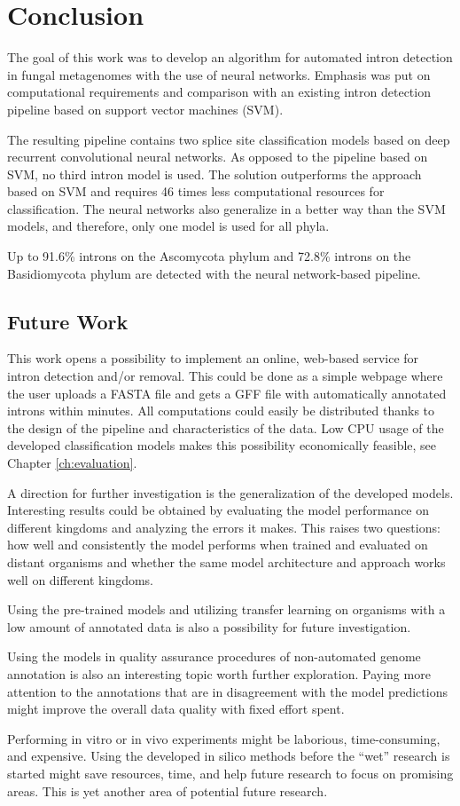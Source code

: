 \chapter{\label{ch:conclusion}Conclusion}

\minitoc

The goal of this work was to develop an algorithm for automated intron
detection in fungal metagenomes with the use of neural networks. Emphasis was
put on computational requirements and comparison with an existing intron
detection pipeline based on support vector machines (SVM).

The resulting pipeline contains two splice site classification models based on
deep recurrent convolutional neural networks. As opposed to the pipeline based
on SVM, no third intron model is used. The solution outperforms the approach
based on SVM and requires 46 times less computational resources for
classification. The neural networks also generalize in a better way than the
SVM models, and therefore, only one model is used for all phyla.

Up to 91.6\% introns on the Ascomycota phylum and 72.8\% introns on the
Basidiomycota phylum are detected with the neural network-based pipeline.

\section{Future Work}

This work opens a possibility to implement an online, web-based service for
intron detection and/or removal. This could be done as a simple webpage where
the user uploads a FASTA file and gets a GFF file with automatically annotated
introns within minutes. All computations could easily be distributed thanks to
the design of the pipeline and characteristics of the data. Low CPU usage of
the developed classification models makes this possibility economically
feasible, see Chapter \ref{ch:evaluation}.

A direction for further investigation is the generalization of the developed
models. Interesting results could be obtained by evaluating the model
performance on different kingdoms and analyzing the errors it makes. This
raises two questions: how well and consistently the model performs when trained
and evaluated on distant organisms and whether the same model architecture and
approach works well on different kingdoms.

Using the pre-trained models and utilizing transfer learning on organisms with
a low amount of annotated data is also a possibility for future investigation.

Using the models in quality assurance procedures of non-automated genome
annotation is also an interesting topic worth further exploration. Paying more
attention to the annotations that are in disagreement with the model
predictions might improve the overall data quality with fixed effort spent.

Performing in vitro or in vivo experiments might be laborious, time-consuming,
and expensive. Using the developed in silico methods before the ``wet''
research is started might save resources, time, and help future research to
focus on promising areas. This is yet another area of potential future
research.
